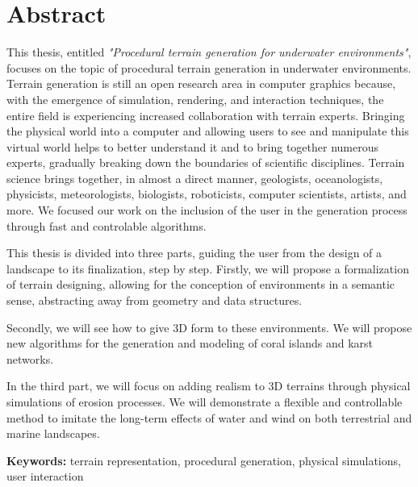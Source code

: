 \clearpage
\pagebreak

\section*{Abstract}
This thesis, entitled \textit{"Procedural terrain generation for underwater environments"}, focuses on the topic of procedural terrain generation in underwater environments. Terrain generation is still an open research area in computer graphics because, with the emergence of simulation, rendering, and interaction techniques, the entire field is experiencing increased collaboration with terrain experts. Bringing the physical world into a computer and allowing users to see and manipulate this virtual world helps to better understand it and to bring together numerous experts, gradually breaking down the boundaries of scientific disciplines. Terrain science brings together, in almost a direct manner, geologists, oceanologists, physicists, meteorologists, biologists, roboticists, computer scientists, artists, and more. We focused our work on the inclusion of the user in the generation process through fast and controlable algorithms.

This thesis is divided into three parts, guiding the user from the design of a landscape to its finalization, step by step.
Firstly, we will propose a formalization of terrain designing, allowing for the conception of environments in a semantic sense, abstracting away from geometry and data structures.

Secondly, we will see how to give 3D form to these environments. We will propose new algorithms for the generation and modeling of coral islands and karst networks.

In the third part, we will focus on adding realism to 3D terrains through physical simulations of erosion processes. We will demonstrate a flexible and controllable method to imitate the long-term effects of water and wind on both terrestrial and marine landscapes.

\textbf{Keywords:} terrain representation, procedural generation, physical simulations, user interaction


